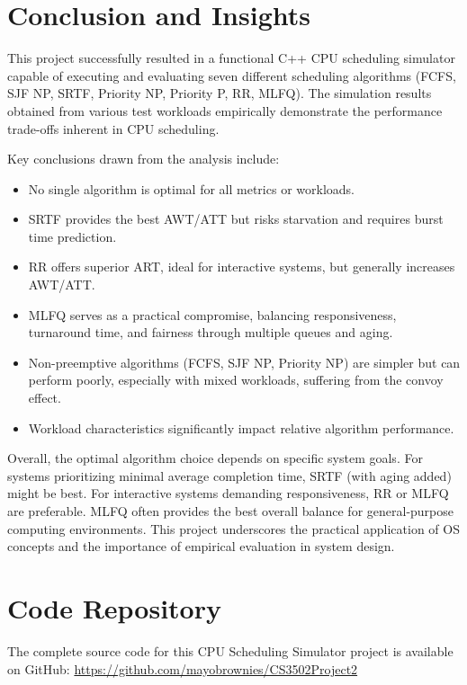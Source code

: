 \documentclass[12pt]{article}
\begin{document}
\section{Conclusion and Insights}
This project successfully resulted in a functional C++ CPU scheduling simulator capable of executing and evaluating seven different scheduling algorithms (FCFS, SJF NP, SRTF, Priority NP, Priority P, RR, MLFQ). The simulation results obtained from various test workloads empirically demonstrate the performance trade-offs inherent in CPU scheduling.

Key conclusions drawn from the analysis include:
\begin{itemize}
    \item No single algorithm is optimal for all metrics or workloads.
    \item SRTF provides the best AWT/ATT but risks starvation and requires burst time prediction.
    \item RR offers superior ART, ideal for interactive systems, but generally increases AWT/ATT.
    \item MLFQ serves as a practical compromise, balancing responsiveness, turnaround time, and fairness through multiple queues and aging.
    \item Non-preemptive algorithms (FCFS, SJF NP, Priority NP) are simpler but can perform poorly, especially with mixed workloads, suffering from the convoy effect.
    \item Workload characteristics significantly impact relative algorithm performance.
\end{itemize}

Overall, the optimal algorithm choice depends on specific system goals. For systems prioritizing minimal average completion time, SRTF (with aging added) might be best. For interactive systems demanding responsiveness, RR or MLFQ are preferable. MLFQ often provides the best overall balance for general-purpose computing environments. This project underscores the practical application of OS concepts and the importance of empirical evaluation in system design.

\section{Code Repository}
The complete source code for this CPU Scheduling Simulator project is available on GitHub:
\url{https://github.com/mayobrownies/CS3502Project2}

\newpage


\end{document}
